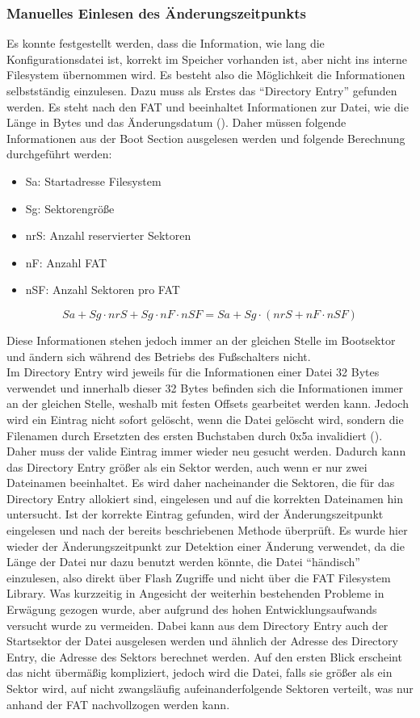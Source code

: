 \subsubsection{Manuelles Einlesen des Änderungszeitpunkts}
Es konnte festgestellt werden, dass die Information, wie lang die Konfigurationsdatei ist, korrekt im Speicher vorhanden ist, aber nicht ins interne Filesystem übernommen wird. Es besteht also die Möglichkeit die Informationen selbstständig einzulesen. Dazu muss als Erstes das ``Directory Entry'' gefunden werden. Es steht nach den \ac{FAT} und beeinhaltet Informationen zur Datei, wie die Länge in Bytes und das Änderungsdatum (\cite[Abschnitt 1.4]{FAT}). Daher müssen folgende Informationen aus der Boot Section ausgelesen werden und folgende Berechnung durchgeführt werden:
\begin{itemize}
    \item Sa: Startadresse Filesystem
    \item Sg: Sektorengröße
    \item nrS: Anzahl reservierter Sektoren
    \item nF: Anzahl \ac{FAT}
    \item nSF: Anzahl Sektoren pro \ac{FAT}
\end{itemize}

\[Sa + Sg \cdot nrS + Sg \cdot nF \cdot nSF = Sa + Sg\cdot(nrS + nF \cdot nSF)\]

Diese Informationen stehen jedoch immer an der gleichen Stelle im Bootsektor und ändern sich während des Betriebs des Fußschalters nicht. \\
Im Directory Entry wird jeweils für die Informationen einer Datei 32 Bytes verwendet und innerhalb dieser 32 Bytes befinden sich die Informationen immer an der gleichen Stelle, weshalb mit festen Offsets gearbeitet werden kann. Jedoch wird ein Eintrag nicht sofort gelöscht, wenn die Datei gelöscht wird, sondern die Filenamen durch Ersetzten des ersten Buchstaben durch 0x5a invalidiert (\cite[Abschnitt 1.4]{FAT}). Daher muss der valide Eintrag immer wieder neu gesucht werden. Dadurch kann das Directory Entry größer als ein Sektor werden, auch wenn er nur zwei Dateinamen beeinhaltet. Es wird daher nacheinander die Sektoren, die für das Directory Entry allokiert sind, eingelesen und auf die korrekten Dateinamen hin untersucht. Ist der korrekte Eintrag gefunden, wird der Änderungszeitpunkt eingelesen und nach der bereits beschriebenen Methode überprüft. Es wurde hier wieder der Änderungszeitpunkt zur Detektion einer Änderung verwendet, da die Länge der Datei nur dazu benutzt werden könnte, die Datei ``händisch'' einzulesen, also direkt über Flash Zugriffe und nicht über die \ac{FAT} Filesystem Library. Was kurzzeitig in Angesicht der weiterhin bestehenden Probleme in Erwägung gezogen wurde, aber aufgrund des hohen Entwicklungsaufwands versucht wurde zu vermeiden. Dabei kann aus dem Directory Entry auch der Startsektor der Datei ausgelesen werden und ähnlich der Adresse des Directory Entry, die Adresse des Sektors berechnet werden. Auf den ersten Blick erscheint das nicht übermäßig kompliziert, jedoch wird die Datei, falls sie größer als ein Sektor wird, auf nicht zwangsläufig aufeinanderfolgende Sektoren verteilt, was nur anhand der \ac{FAT} nachvollzogen werden kann.

